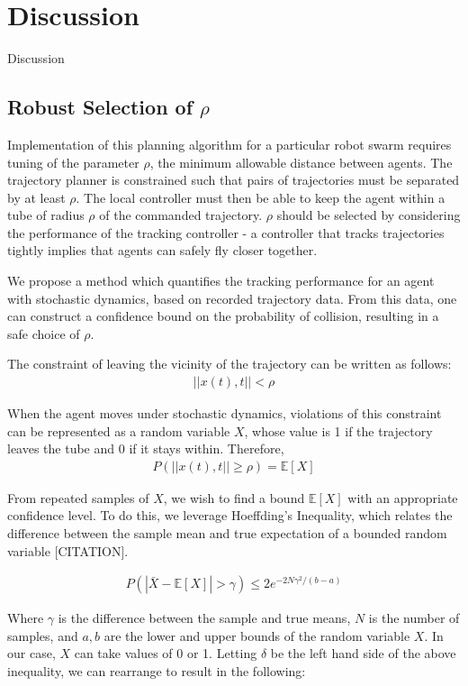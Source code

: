 \section{Discussion}

Discussion
\subsection{Robust Selection of $\rho$}
Implementation of this planning algorithm for a particular robot swarm requires
tuning of the parameter $\rho$, the minimum allowable distance between agents.
The trajectory planner is constrained such that pairs of trajectories must be separated
by at least $\rho$.
The local controller must then be able to keep the agent within a tube of radius $\rho$ 
of the commanded trajectory.
$\rho$ should be selected by considering the performance of the tracking controller
- a controller that tracks trajectories tightly implies that agents can safely fly closer
together. 

We propose a method which quantifies the tracking performance for an agent with
stochastic dynamics, based on recorded trajectory data. From this data, one 
can construct a confidence bound on the probability of collision, resulting in a safe
choice of $\rho$.

The constraint of leaving the vicinity of the trajectory can be written as follows:
\begin{align}
    ||x(t), t|| < \rho
\end{align}

When the agent moves under stochastic dynamics, violations of this constraint can be represented
as a random variable $X$, whose value is 1 if the trajectory leaves the tube and 0 if it stays within.
Therefore,
\begin{align}
    P(||x(t), t|| \geq \rho) = \mathbb{E}[X]
\end{align}

From repeated samples of $X$, we wish to find a bound $\mathbb{E}[X]$ with an appropriate confidence level. 
To do this, we leverage Hoeffding's Inequality, which relates the difference between the sample mean and true 
expectation of a bounded random variable [CITATION].

\begin{align}
    P(|\bar{X} - \mathbb{E}[X]| > \gamma) \leq 2e^{-2N\gamma^{2}/(b-a)}
\end{align}

Where $\gamma$ is the difference between the sample and true means, $N$ is the number of samples, and $a, b$ 
are the lower and upper bounds of the random variable $X$. In our case, $X$ can take values of 0 or 1. Letting 
$\delta$ be the left hand side of the above inequality, we can rearrange to result in the following:

